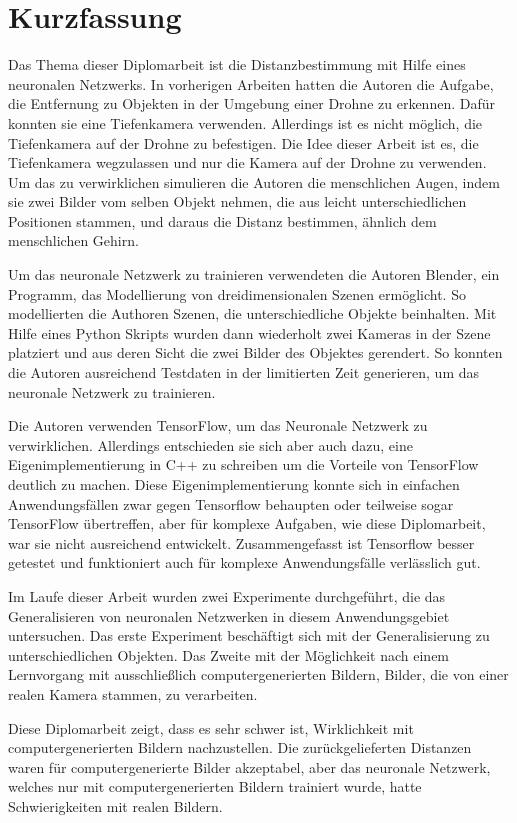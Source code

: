 \chapter{Kurzfassung}

Das Thema dieser Diplomarbeit ist die Distanzbestimmung mit Hilfe eines neuronalen Netzwerks. In vorherigen Arbeiten hatten die Autoren die Aufgabe, die Entfernung zu Objekten in der Umgebung einer Drohne zu erkennen. Dafür konnten sie eine Tiefenkamera verwenden. Allerdings ist es nicht möglich, die Tiefenkamera auf der Drohne zu befestigen. Die Idee dieser Arbeit ist es, die Tiefenkamera wegzulassen und nur die Kamera auf der Drohne zu verwenden. Um das zu verwirklichen simulieren die Autoren die menschlichen Augen, indem sie zwei Bilder vom selben Objekt nehmen, die aus leicht unterschiedlichen Positionen stammen, und daraus die Distanz bestimmen, ähnlich dem menschlichen Gehirn.

Um das neuronale Netzwerk zu trainieren verwendeten die Autoren Blender, ein Programm, das Modellierung von dreidimensionalen Szenen ermöglicht. So modellierten die Authoren Szenen, die unterschiedliche Objekte beinhalten. Mit Hilfe eines Python Skripts wurden dann wiederholt zwei Kameras in der Szene platziert und aus deren Sicht die zwei Bilder des Objektes gerendert. So konnten die Autoren ausreichend Testdaten in der limitierten Zeit generieren, um das neuronale Netzwerk zu trainieren.

Die Autoren verwenden TensorFlow, um das Neuronale Netzwerk zu verwirklichen. Allerdings entschieden sie sich aber auch dazu, eine Eigenimplementierung in C++ zu schreiben um die Vorteile von TensorFlow deutlich zu machen. Diese Eigenimplementierung konnte sich in einfachen Anwendungsfällen zwar gegen Tensorflow behaupten oder teilweise sogar TensorFlow übertreffen, aber für komplexe Aufgaben, wie diese Diplomarbeit, war sie nicht ausreichend entwickelt. Zusammengefasst ist Tensorflow besser getestet und funktioniert auch für komplexe Anwendungsfälle verlässlich gut.

Im Laufe dieser Arbeit wurden zwei Experimente durchgeführt, die das Generalisieren von neuronalen Netzwerken in diesem Anwendungsgebiet untersuchen. Das erste Experiment beschäftigt sich mit der Generalisierung zu unterschiedlichen Objekten. Das Zweite mit der Möglichkeit nach einem Lernvorgang mit ausschließlich computergenerierten Bildern, Bilder, die von einer realen Kamera stammen, zu verarbeiten.

Diese Diplomarbeit zeigt, dass es sehr schwer ist, Wirklichkeit mit computergenerierten Bildern nachzustellen. Die zurückgelieferten Distanzen waren für computergenerierte Bilder akzeptabel, aber das neuronale Netzwerk, welches nur mit computergenerierten Bildern trainiert wurde, hatte Schwierigkeiten mit realen Bildern.


